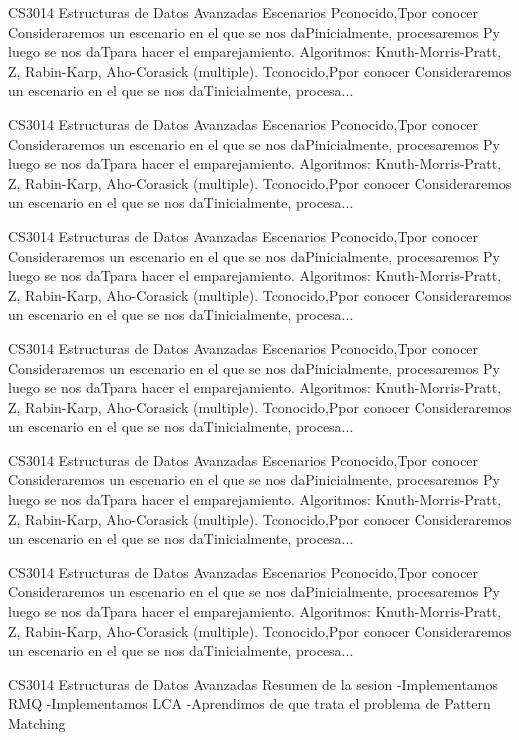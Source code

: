 \begin{description}[leftmargin=!,labelwidth=4.2em,style=nextline]
\item[Pag. 25] CS3014 Estructuras de Datos Avanzadas Escenarios Pconocido,Tpor conocer Consideraremos un escenario en el que se nos daPinicialmente, procesaremos Py luego se nos daTpara hacer el emparejamiento. Algoritmos: Knuth-Morris-Pratt, Z, Rabin-Karp, Aho-Corasick (multiple). Tconocido,Ppor conocer Consideraremos un escenario en el que se nos daTinicialmente, procesa...
\item[Pag. 26] CS3014 Estructuras de Datos Avanzadas Escenarios Pconocido,Tpor conocer Consideraremos un escenario en el que se nos daPinicialmente, procesaremos Py luego se nos daTpara hacer el emparejamiento. Algoritmos: Knuth-Morris-Pratt, Z, Rabin-Karp, Aho-Corasick (multiple). Tconocido,Ppor conocer Consideraremos un escenario en el que se nos daTinicialmente, procesa...
\item[Pag. 27] CS3014 Estructuras de Datos Avanzadas Escenarios Pconocido,Tpor conocer Consideraremos un escenario en el que se nos daPinicialmente, procesaremos Py luego se nos daTpara hacer el emparejamiento. Algoritmos: Knuth-Morris-Pratt, Z, Rabin-Karp, Aho-Corasick (multiple). Tconocido,Ppor conocer Consideraremos un escenario en el que se nos daTinicialmente, procesa...
\item[Pag. 28] CS3014 Estructuras de Datos Avanzadas Escenarios Pconocido,Tpor conocer Consideraremos un escenario en el que se nos daPinicialmente, procesaremos Py luego se nos daTpara hacer el emparejamiento. Algoritmos: Knuth-Morris-Pratt, Z, Rabin-Karp, Aho-Corasick (multiple). Tconocido,Ppor conocer Consideraremos un escenario en el que se nos daTinicialmente, procesa...
\item[Pag. 29] CS3014 Estructuras de Datos Avanzadas Escenarios Pconocido,Tpor conocer Consideraremos un escenario en el que se nos daPinicialmente, procesaremos Py luego se nos daTpara hacer el emparejamiento. Algoritmos: Knuth-Morris-Pratt, Z, Rabin-Karp, Aho-Corasick (multiple). Tconocido,Ppor conocer Consideraremos un escenario en el que se nos daTinicialmente, procesa...
\item[Pag. 30] CS3014 Estructuras de Datos Avanzadas Escenarios Pconocido,Tpor conocer Consideraremos un escenario en el que se nos daPinicialmente, procesaremos Py luego se nos daTpara hacer el emparejamiento. Algoritmos: Knuth-Morris-Pratt, Z, Rabin-Karp, Aho-Corasick (multiple). Tconocido,Ppor conocer Consideraremos un escenario en el que se nos daTinicialmente, procesa...
\item[Pag. 31] CS3014 Estructuras de Datos Avanzadas Resumen de la sesion -Implementamos RMQ -Implementamos LCA -Aprendimos de que trata el problema de Pattern Matching

\end{description}
